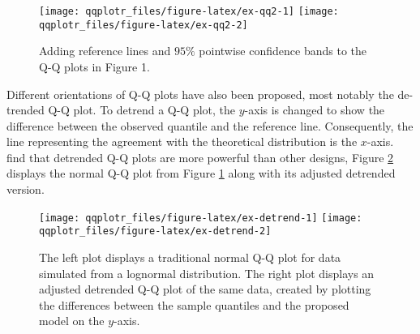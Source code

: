 \begin{Schunk}
\begin{figure}

{\centering \texttt{[image: qqplotr\_files/figure-latex/ex-qq2-1]} \texttt{[image: qqplotr\_files/figure-latex/ex-qq2-2]} 

}

\caption[Adding reference lines and $95\%$ pointwise confidence bands to the Q-Q plots in Figure 1]{Adding reference lines and $95\%$ pointwise confidence bands to the Q-Q plots in Figure 1.}\label{fig:ex-qq2}
\end{figure}
\end{Schunk}

Different orientations of Q-Q plots have also been proposed, most
notably the de-trended Q-Q plot. To detrend a Q-Q plot, the \(y\)-axis
is changed to show the difference between the observed quantile and the
reference line. Consequently, the line representing the agreement with
the theoretical distribution is the \(x\)-axis. \citet{Loy2016-fg} find
that detrended Q-Q plots are more powerful than other designs,
Figure \ref{fig:ex-detrend} displays the normal Q-Q plot from Figure
\ref{fig:ex-qq2} along with its adjusted detrended version.

\begin{Schunk}
\begin{figure}

{\centering \texttt{[image: qqplotr\_files/figure-latex/ex-detrend-1]} \texttt{[image: qqplotr\_files/figure-latex/ex-detrend-2]} 

}

\caption[The left plot displays a traditional normal Q-Q plot for data simulated from a lognormal distribution]{The left plot displays a traditional normal Q-Q plot for data simulated from a lognormal distribution. The right plot displays an adjusted detrended Q-Q plot of the same data, created by plotting the differences between the sample quantiles and the proposed model on the $y$-axis.}\label{fig:ex-detrend}
\end{figure}
\end{Schunk}

